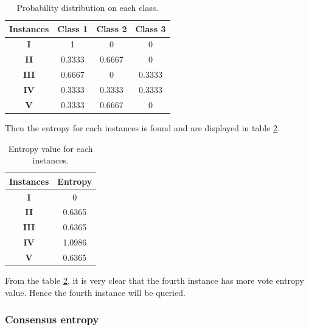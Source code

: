 \begin{table}[h!]
	\centering
	\begin{tabular}{|c|c|c|c|}
		\hline
		\textbf{Instances} & \textbf{Class 1} & \textbf{Class 2} & \textbf{Class 3} \\ \hline
		\textbf{I}         & 1                & 0                & 0                \\ \hline
		\textbf{II}        & 0.3333           & 0.6667           & 0                \\ \hline
		\textbf{III}       & 0.6667           & 0                & 0.3333           \\ \hline
		\textbf{IV}        & 0.3333           & 0.3333           & 0.3333           \\ \hline
		\textbf{V}         & 0.3333           & 0.6667           & 0                \\ \hline
	\end{tabular}
\caption{Probability distribution on each class.}
\label{vote2}
\end{table}

Then the entropy for each instances is found and are displayed in table \ref{vote3}. 

\begin{table}[h!]
	\centering
	\begin{tabular}{|c|c|}
		\hline
		\textbf{Instances} & \textbf{Entropy} \\ \hline
		\textbf{I}         & 0                \\ \hline
		\textbf{II}        & 0.6365           \\ \hline
		\textbf{III}       & 0.6365           \\ \hline
		\textbf{IV}        & 1.0986           \\ \hline
		\textbf{V}         & 0.6365           \\ \hline
	\end{tabular}
	\caption{Entropy value for each instances.}
	\label{vote3}
\end{table}

From the table \ref{vote3}, it is very clear that the fourth instance has more vote entropy value. Hence the fourth instance will be queried. \cite{Settles2010}

\subsubsection{Consensus entropy}

